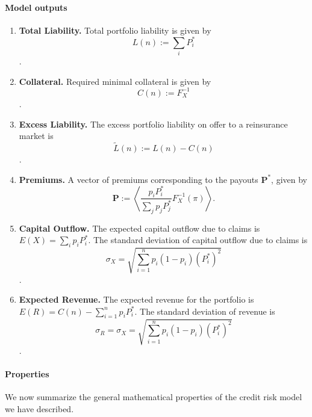 \documentclass[12pt,a4paper]{article}
\begin{document}
\paragraph{Model outputs\label{outputs}}

\begin{enumerate}
    \item \textbf{Total Liability.} Total portfolio liability is given by $$L(n) := \sum_i P_i^*$$.
    \item \textbf{Collateral.} Required minimal collateral is given by $$C(n) := F_X^{-1}$$.
    \item \textbf{Excess Liability.} The excess portfolio liability on offer to a reinsurance market is $$\tilde{L}(n) := L(n) - C(n)$$.
    \item \textbf{Premiums.} A vector of premiums corresponding to the payouts $\mathbf{P^*}$, given by $$\mathbf{P}:=\left<\frac{p_iP_i^*}{\sum_j p_j P_j^* }F_X^{-1}(\pi)\right>.$$
    \item \textbf{Capital Outflow.} The expected capital outflow due to claims is $E(X)=\sum_i p_iP_i^*$. The standard deviation of capital outflow due to claims is $$\sigma_X =  \sqrt{\sum_{i=1}^np_i(1-p_i)(P_i^*)^2}$$.
    \item \textbf{Expected Revenue.} The expected revenue for the portfolio is $E(R) = C(n) - \sum_{i=1}^n p_i P_i^*$. The standard deviation of revenue is $$\sigma_R = \sigma_X = \sqrt{\sum_{i=1}^np_i(1-p_i)(P_i^*)^2}$$.
\end{enumerate}

\paragraph{Properties}

We now summarize the general mathematical properties of the credit risk model we have described.
\end{document}
